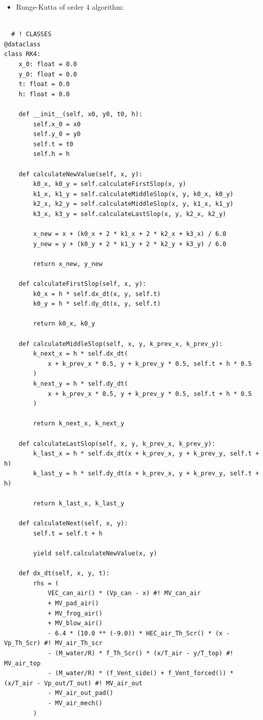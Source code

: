 \documentclass[a4paper]{article}
\numberwithin{equation}{section}
\begin{document}
\begin{itemize}
    \item Runge-Kutta of order 4 algorithm:
\end{itemize}

\begin{mdframed}[leftline=false,rightline=false,backgroundcolor=cyan!10,nobreak=false]
  \begin{verbatim}
  
  # ! CLASSES
@dataclass
class RK4:
    x_0: float = 0.0
    y_0: float = 0.0
    t: float = 0.0
    h: float = 0.0

    def __init__(self, x0, y0, t0, h):
        self.x_0 = x0
        self.y_0 = y0
        self.t = t0
        self.h = h

    def calculateNewValue(self, x, y):
        k0_x, k0_y = self.calculateFirstSlop(x, y)
        k1_x, k1_y = self.calculateMiddleSlop(x, y, k0_x, k0_y)
        k2_x, k2_y = self.calculateMiddleSlop(x, y, k1_x, k1_y)
        k3_x, k3_y = self.calculateLastSlop(x, y, k2_x, k2_y)

        x_new = x + (k0_x + 2 * k1_x + 2 * k2_x + k3_x) / 6.0
        y_new = y + (k0_y + 2 * k1_y + 2 * k2_y + k3_y) / 6.0

        return x_new, y_new

    def calculateFirstSlop(self, x, y):
        k0_x = h * self.dx_dt(x, y, self.t)
        k0_y = h * self.dy_dt(x, y, self.t)

        return k0_x, k0_y

    def calculateMiddleSlop(self, x, y, k_prev_x, k_prev_y):
        k_next_x = h * self.dx_dt(
            x + k_prev_x * 0.5, y + k_prev_y * 0.5, self.t + h * 0.5
        )
        k_next_y = h * self.dy_dt(
            x + k_prev_x * 0.5, y + k_prev_y * 0.5, self.t + h * 0.5
        )

        return k_next_x, k_next_y

    def calculateLastSlop(self, x, y, k_prev_x, k_prev_y):
        k_last_x = h * self.dx_dt(x + k_prev_x, y + k_prev_y, self.t + h)
        k_last_y = h * self.dy_dt(x + k_prev_x, y + k_prev_y, self.t + h)

        return k_last_x, k_last_y

    def calculateNext(self, x, y):
        self.t = self.t + h

        yield self.calculateNewValue(x, y)

    def dx_dt(self, x, y, t):
        rhs = (
            VEC_can_air() * (Vp_can - x) #! MV_can_air
            + MV_pad_air()
            + MV_frog_air()
            + MV_blow_air()
            - 6.4 * (10.0 ** (-9.0)) * HEC_air_Th_Scr() * (x - Vp_Th_Scr) #! MV_air_Th_scr
            - (M_water/R) * f_Th_Scr() * (x/T_air - y/T_top) #! MV_air_top
            - (M_water/R) * (f_Vent_side() + f_Vent_forced()) * (x/T_air - Vp_out/T_out) #! MV_air_out
            - MV_air_out_pad()
            - MV_air_mech()
        )


\end{verbatim}
\end{mdframed}
\end{document}
